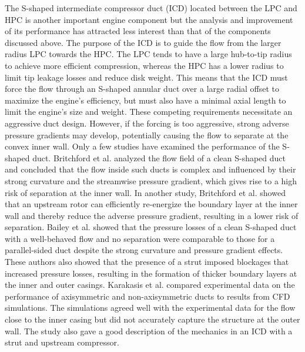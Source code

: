 The S-shaped intermediate compressor duct (ICD) located between the LPC and HPC is another important engine component but the analysis and improvement of its performance has attracted less interest than that of the components discussed above. The purpose of the ICD is to guide the flow from the larger radius LPC towards the HPC. The LPC tends to have a large hub-to-tip radius to achieve more efficient compression, whereas the HPC has a lower radius to limit tip leakage losses and reduce disk weight. This means that the ICD must force the flow through an S-shaped annular duct over a large radial offset to maximize the engine's efficiency, but must also have a minimal axial length to limit the engine's size and weight. These competing requirements necessitate an aggressive duct design. However, if the forcing is too aggressive, strong adverse pressure gradients may develop, potentially causing the flow to separate at the convex inner wall. Only a few studies have examined the performance of the S-shaped duct. Britchford et al.\cite{Britchford1994} analyzed the flow field of a clean S-shaped duct and concluded that the flow inside such ducts is complex and influenced by their strong curvature and the streamwise pressure gradient, which gives rise to a high risk of separation at the inner wall. In another study, Britchford et al.\cite{Britchford1994b} showed that an upstream rotor can efficiently re-energize the boundary layer at the inner wall and thereby reduce the adverse pressure gradient, resulting in a lower risk of separation. Bailey et al.\cite{Bailey} showed that the pressure losses of a clean S-shaped duct with a well-behaved flow and no separation were comparable to those for a parallel-sided duct despite the strong curvature and pressure gradient effects. These authors also showed that the presence of a strut imposed blockages that increased pressure losses, resulting in the formation of thicker boundary layers at the inner and outer casings. Karakasis et al.\cite{Karakasis2010} compared experimental data on the performance of axisymmetric and non-axisymmetric ducts to results from CFD simulations. The simulations agreed well with the experimental data for the flow close to the inner casing but did not accurately capture the structure at the outer wall. The study also gave a good description of the mechanics in an ICD with a strut and upstream compressor.


